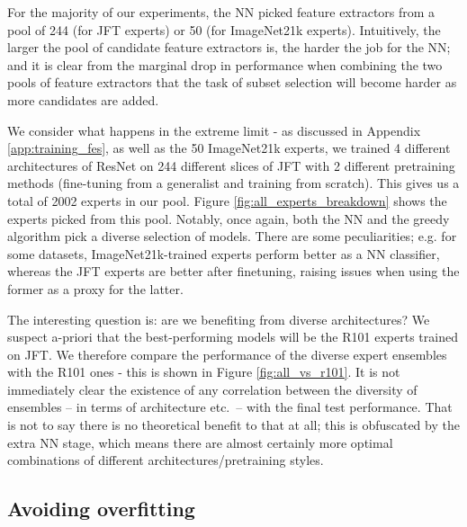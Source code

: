 \documentclass{article} \usepackage{iclr2021_conference,times}
\begin{document}
For the majority of our experiments, the NN picked  feature extractors from a pool of 244 (for JFT experts) or 50 (for ImageNet21k experts). Intuitively, the larger the pool of candidate feature extractors is, the harder the job for the NN; and it is clear from the marginal drop in performance when combining the two pools of feature extractors that the task of subset selection will become harder as more candidates are added.


We consider what happens in the extreme limit - as discussed in Appendix \ref{app:training_fes}, as well as the 50 ImageNet21k experts, we trained 4 different architectures of ResNet on 244 different slices of JFT with 2 different pretraining methods (fine-tuning from a generalist and training from scratch). This gives us a total of 2002 experts in our pool.
Figure \ref{fig:all_experts_breakdown} shows the experts picked from this pool. Notably, once again, both the NN and the greedy algorithm pick a diverse selection of models. There are some peculiarities; e.g. for some datasets, ImageNet21k-trained experts perform better as a NN classifier, whereas the JFT experts are better after finetuning, raising issues when using the former as a proxy for the latter.

The interesting question is: are we benefiting from diverse architectures?
We suspect a-priori that the best-performing models will be the R101 experts trained on JFT.
We therefore compare the performance of the diverse expert ensembles with the R101 ones - this is shown in Figure \ref{fig:all_vs_r101}.
It is not immediately clear the existence of any correlation between the diversity of ensembles -- in terms of architecture etc.\ -- with the final test performance. That is not to say there is no theoretical benefit to that at all; this is obfuscated by the extra NN stage, which means there are almost certainly more optimal combinations of different architectures/pretraining styles.






\subsection{Avoiding overfitting}
\label{app:overfitting}
\end{document}
